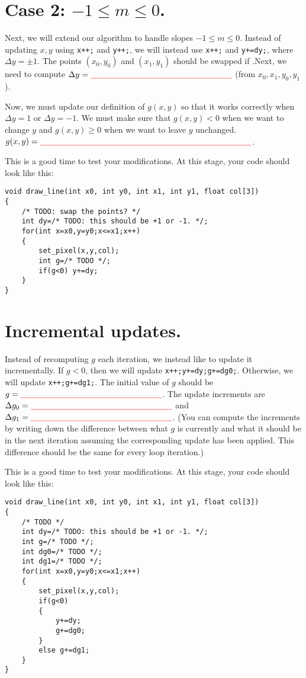 \documentclass[12pt]{article}
\newcommand{\TODOL}[1]{\textcolor{red}{\underline{\hspace{#1 cm}}}}
\begin{document}
\section{Case 2: $-1 \le m \le 0$.}

Next, we will extend our algorithm to handle slopes $-1 \le m \le 0$.  Instead
of updating $x,y$ using \texttt{x++;} and \texttt{y++;}, we will instead use
\texttt{x++;} and \texttt{y+=dy;}, where $\Delta y = \pm 1$.  The points
$(x_0,y_0)$ and $(x_1,y_1)$ should be swapped if \TODOL6.Next, we need to compute $\Delta y = \TODOL6$ (from $x_0, x_1, y_0, y_1$).

Now, we must update our definition of $g(x,y)$ so that it works correctly when
$\Delta y = 1$ or $\Delta y = -1$.  We must make sure that $g(x,y)<0$
when we want to change $y$ and $g(x,y) \ge 0$ when we want to leave $y$
unchanged.  $g(x,y) = \TODOL9$.

This is a good time to test your modifications.  At this stage, your code should
look like this:
\begin{lstlisting}
void draw_line(int x0, int y0, int x1, int y1, float col[3])
{
    /* TODO: swap the points? */
    int dy=/* TODO: this should be +1 or -1. */;
    for(int x=x0,y=y0;x<=x1;x++)
    {
        set_pixel(x,y,col);
        int g=/* TODO */;
        if(g<0) y+=dy;
    }
}
\end{lstlisting}

\section{Incremental updates.}

Instead of recomputing $g$ each iteration, we instead like to update it
incrementally.  If $g<0$, then we will update \texttt{x++;y+=dy;g+=dg0;}.
Otherwise, we will update \texttt{x++;g+=dg1;}.  The initial value of $g$ should
be $g = \TODOL6$.  The update increments are $\Delta g_0 = \TODOL6$ and $\Delta
g_1 = \TODOL6$.  (You can compute the increments by writing down the difference
between what $g$ is currently and what it should be in the next iteration
assuming the corresponding update has been applied.  This difference should be
the same for every loop iteration.)

This is a good time to test your modifications.  At this stage, your code should
look like this:
\begin{lstlisting}
void draw_line(int x0, int y0, int x1, int y1, float col[3])
{
    /* TODO */
    int dy=/* TODO: this should be +1 or -1. */;
    int g=/* TODO */;
    int dg0=/* TODO */;
    int dg1=/* TODO */;
    for(int x=x0,y=y0;x<=x1;x++)
    {
        set_pixel(x,y,col);
        if(g<0)
        {
            y+=dy;
            g+=dg0;
        }
        else g+=dg1;
    }
}
\end{lstlisting}
\end{document}
